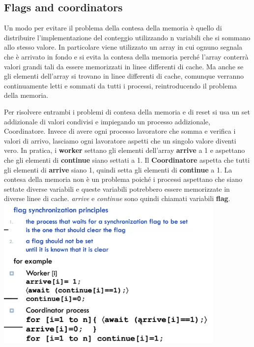 \documentclass[10pt,a4paper]{article}
\begin{document}
\subsection{Flags and coordinators}
Un modo per evitare il problema della contesa della memoria è quello di distribuire l'implementazione del conteggio utilizzando n variabili che si sommano allo stesso valore. In particolare viene utilizzato un array in cui ognuno segnala che è arrivato in fondo e si evita la contesa della memoria perché l'array conterrà valori grandi tali da essere memorizzati in linee differenti di cache. Ma anche se gli elementi dell'array si trovano in linee differenti di cache, comunque verranno continuamente letti e sommati da tutti i processi, reintroducendo il problema della memoria.

Per risolvere entrambi i problemi di contesa della memoria e di reset si usa un set addizionale di valori condivisi e impiegando un processo addizionale, Coordinatore. Invece di avere ogni processo lavoratore che somma e verifica i valori di arrivo, lasciamo ogni lavoratore aspetti che un singolo valore diventi vero.
In pratica, i \textbf{worker} settano gli elementi dell'array \textbf{arrive} a 1 e aspettano che gli elementi di \textbf{continue} siano settati a 1.
Il \textbf{Coordinatore} aspetta che tutti gli elementi di \textbf{arrive} siano 1, quindi setta gli elementi di \textbf{continue} a 1.
La contesa della memoria non è un problema poiché i processi aspettano che siano settate diverse variabili e queste variabili potrebbero essere memorizzate in diverse linee di cache.
\textit{arrive} e \textit{continue} sono quindi chiamati variabili \textbf{flag}.\\

\includegraphics[scale=0.6]{img/flag.png} \\ \\
\end{document}
